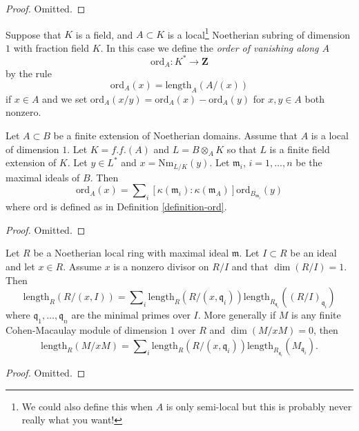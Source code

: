 \begin{proof}
Omitted.
\end{proof}

\begin{definition}
\label{definition-ord}
Suppose that $K$ is a field, and $A \subset K$ is a
local\footnote{We could also define this when $A$ is only
semi-local but this is probably never really what you want!}
Noetherian subring of dimension $1$ with fraction field $K$.
In this case we define the {\it order of vanishing along $A$}
$$
\text{ord}_A : K^* \longrightarrow \mathbf{Z}
$$
by the rule
$$
\text{ord}_A(x) = \text{length}_A(A/(x))
$$
if $x \in A$ and we set
$\text{ord}_A(x/y) = \text{ord}_A(x) - \text{ord}_A(y)$
for $x, y \in A$ both nonzero.
\end{definition}

\begin{lemma}
\label{lemma-finite-extension-dim-1}
Let $A \subset B$ be a finite extension of Noetherian domains.
Assume that $A$ is a local of dimension $1$.
Let $K = f.f.(A)$ and $L = B \otimes_A K$ so that $L$ is
a finite field extension of $K$.
Let $y \in L^*$ and $x = \text{Nm}_{L/K}(y)$.
Let $\mathfrak m_i$, $i = 1, \ldots, n$ be the maximal ideals of $B$.
Then
$$
\text{ord}_A(x) =
\sum\nolimits_i
[\kappa(\mathfrak m_i) : \kappa(\mathfrak m_A)]
\text{ord}_{B_{\mathfrak m_i}}(y)
$$
where $\text{ord}$ is defined as in Definition \ref{definition-ord}.
\end{lemma}

\begin{proof}
Omitted.
\end{proof}



\begin{lemma}
\label{lemma-additivity-divisors-restricted}
Let $R$ be a Noetherian local ring with maximal ideal $\mathfrak m$.
Let $I \subset R$ be an ideal and let $x \in R$.
Assume $x$ is a nonzero divisor on $R/I$ and that $\dim(R/I) = 1$.
Then
$$
\text{length}_R(R/(x, I))
=
\sum\nolimits_i \text{length}_R(R/(x, \mathfrak q_i))
\text{length}_{R_{\mathfrak q_i}}((R/I)_{\mathfrak q_i})
$$
where $\mathfrak q_1, \ldots, \mathfrak q_n$ are the minimal
primes over $I$. More generally if $M$ is any finite Cohen-Macaulay
module of dimension $1$ over $R$ and $\dim(M/xM) = 0$, then
$$
\text{length}_R(M/xM)
=
\sum\nolimits_i \text{length}_R(R/(x, \mathfrak q_i))
\text{length}_{R_{\mathfrak q_i}}(M_{\mathfrak q_i}).
$$
\end{lemma}

\begin{proof}
Omitted.
\end{proof}



